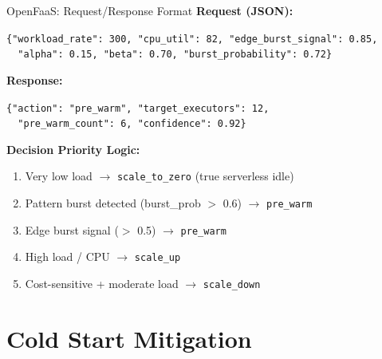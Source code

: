 \documentclass{beamer}
\begin{document}
\begin{frame}{OpenFaaS: Request/Response Format}
\textbf{Request (JSON):}
\begin{center}
\footnotesize
\texttt{\{"workload\_rate": 300, "cpu\_util": 82, "edge\_burst\_signal": 0.85,}\\
\texttt{~~"alpha": 0.15, "beta": 0.70, "burst\_probability": 0.72\}}
\end{center}
\vspace{0.2cm}
\textbf{Response:}
\begin{center}
\footnotesize
\texttt{\{"action": "pre\_warm", "target\_executors": 12,}\\
\texttt{~~"pre\_warm\_count": 6, "confidence": 0.92\}}
\end{center}
\vspace{0.3cm}
\textbf{Decision Priority Logic:}
\begin{enumerate}
    \footnotesize
    \item Very low load $\rightarrow$ \texttt{scale\_to\_zero} (true serverless idle)
    \item Pattern burst detected (burst\_prob $>$ 0.6) $\rightarrow$ \texttt{pre\_warm}
    \item Edge burst signal ($>$ 0.5) $\rightarrow$ \texttt{pre\_warm}
    \item High load / CPU $\rightarrow$ \texttt{scale\_up}
    \item Cost-sensitive + moderate load $\rightarrow$ \texttt{scale\_down}
\end{enumerate}
\end{frame}

\section{Cold Start Mitigation}
\end{document}
